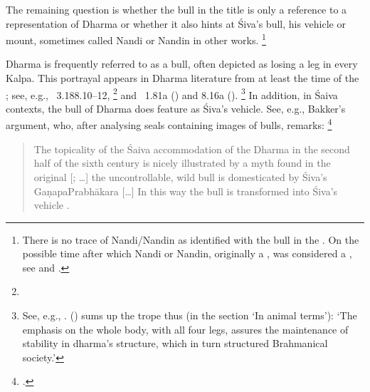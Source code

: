 The\label{bull} remaining question is whether the bull in the title 
is only a reference to a representation of Dharma 
or whether it also hints at Śiva's bull, his vehicle or mount,
sometimes called Nandi or Nandin in other works.%
		\footnote{There is no trace of Nandi/Nandin
		as identified with the bull in the \Vss.
		On the possible time after which 
		Nandi or Nandin, originally a ,
		was considered a , see 
		 and 
		.}

Dharma is frequently referred to as a bull, 
often depicted as losing a leg in every Kalpa.
This portrayal appears in Dharma literature from at least the time of the \MBh;
see, e.g., \MBH\ 3.188.10--12,%
	\footnote{}
and \Manu\ 1.81a
() and 8.16a
().%
	 \footnote{See, e.g., .
	 \citeauthor{GutierrezEmbodiment} (\citeyear{GutierrezEmbodiment})
	 sums up the trope thus
	 (in the section `In animal terms'): 
	 `The emphasis on the whole body, with all four legs, assures 
	 the maintenance of stability in dharma's structure, which in 
	 turn structured Brahmanical society.'}
In addition, in Śaiva contexts, the bull of Dharma
does feature as Śiva's vehicle. See, e.g., Bakker's argument, who,
after analysing seals containing images of bulls, remarks:%
                \footnote{.}


\begin{quote}
The topicality of the Śaiva accommodation 
of the Dharma in the second half of the 
sixth century is nicely illustrated by a myth found in the
original [; \dots]
the uncontrollable, wild bull  is 
domesticated by Śiva's Gaṇapa\linebreak Prabhākara [\dots]
In this way the bull is transformed into Śiva’s vehicle .
\end{quote}

